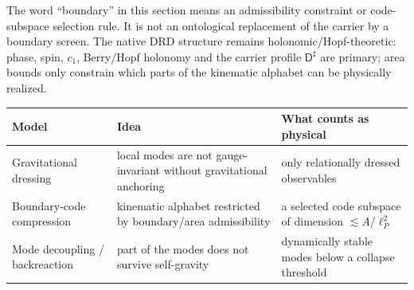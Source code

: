 \documentclass[11pt,a4paper]{article}
\theoremstyle{definition}
\theoremstyle{remark}
\newcommand{\lP}{\ell_{P}}
\newcommand{\Dsharp}{\mathsf{D}^{\sharp}}
\begin{document}
\begin{tcolorbox}[colback=gray!4,colframe=gray!50,title=Holonomy discipline]
The word ``boundary'' in this section means an admissibility constraint or code-subspace
selection rule.  It is not an ontological replacement of the carrier by a boundary screen.
The native DRD structure remains holonomic/Hopf-theoretic: phase, spin, $c_1$, Berry/Hopf
holonomy and the carrier profile $\Dsharp$ are primary; area bounds only constrain which
parts of the kinematic alphabet can be physically realized.
\end{tcolorbox}

\begin{center}
\small
\begin{tabularx}{\textwidth}{@{}lYY@{}}
\toprule
\textbf{Model} & \textbf{Idea} & \textbf{What counts as physical}\\
\midrule
Gravitational dressing & local modes are not gauge-invariant without gravitational anchoring &
only relationally dressed observables\\
Boundary-code compression & kinematic alphabet restricted by boundary/area admissibility &
a selected code subspace of dimension $\lesssim A/\lP^{2}$\\
Mode decoupling / backreaction & part of the modes does not survive self-gravity &
dynamically stable modes below a collapse threshold\\
\bottomrule
\end{tabularx}

\end{center}
\end{document}
